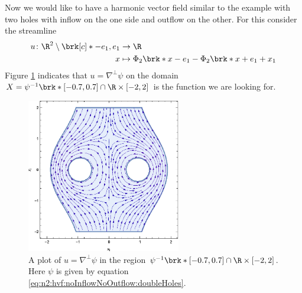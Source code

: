 Now we would like to have a harmonic vector field similar to the example with two holes with
inflow on the one side and outflow on the other. 
For this consider the streamline
\begin{equation}
  \begin{aligned}
  u\colon\R^2\setminus\brk[c]*{-e_1,e_1}&\to\R \\
  x&\mapsto\Phi_2\brk*{x-e_1}-\Phi_2\brk*{x+e_1}+x_1
  \end{aligned}\label{eq:n2:hvf:noInflowNoOutflow:doubleHoles}
\end{equation}
Figure \ref{pl:n2_hvf_InflowOutflow_symmetric_region} indicates that $u=\nabla^\perp\psi$ 
on the domain $X=\psi^{-1}\brk*{[-0.7,0.7]}\cap \R\times[-2,2]$ is the function
we are looking for.
\begin{figure}
  \centering
  \includegraphics[width=0.6\textwidth]{../Plots/HarmonicVectorFields_gr2.eps}
  \caption{A plot of $u=\nabla^\perp\psi$ in the region $\psi^{-1}\brk*{[-0.7,0.7]}\cap \R\times[-2,2]$.
  Here $\psi$ is given by equation \eqref{eq:n2:hvf:noInflowNoOutflow:doubleHoles}.}
  \label{pl:n2_hvf_InflowOutflow_symmetric_region}
\end{figure}


